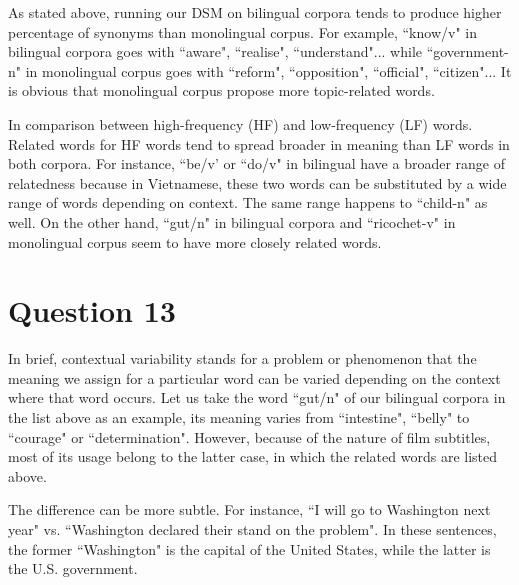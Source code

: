 \documentclass[12pt]{article}
\begin{document}
As stated above, running our DSM on bilingual corpora tends to produce higher percentage of synonyms than monolingual corpus. For example, ``know/v" in bilingual corpora goes with ``aware", ``realise", ``understand"... while ``government-n" in monolingual corpus goes with ``reform", ``opposition", ``official", ``citizen"... It is obvious that monolingual corpus propose more topic-related words.

In comparison between high-frequency (HF) and low-frequency (LF) words. Related words for HF words tend to spread broader in meaning than LF words in both corpora. For instance, ``be/v' or ``do/v" in bilingual have a broader range of relatedness because in Vietnamese, these two words can be substituted by a wide range of words depending on context. The same range happens to ``child-n" as well. On the other hand, ``gut/n" in bilingual corpora and ``ricochet-v" in monolingual corpus seem to have more closely related words.

\section{Question 13}
In brief, contextual variability stands for a problem or phenomenon that the meaning we assign for a particular word can be varied depending on the context where that word occurs. Let us take the word ``gut/n" of our bilingual corpora in the list above as an example, its meaning varies from ``intestine", ``belly" to ``courage" or ``determination". However, because of the nature of film subtitles, most of its usage belong to the latter case, in which the related words are listed above.

The difference can be more subtle. For instance, ``I will go to Washington next year" vs. ``Washington declared their stand on the problem". In these sentences, the former ``Washington" is the capital of the United States, while the latter is the U.S. government.
\end{document}
